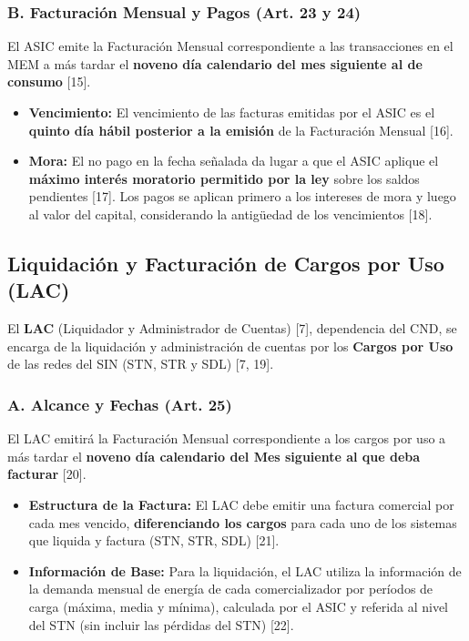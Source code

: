 \documentclass[a5paper]{book}%
\begin{document}
  \subsubsection*{B. Facturación Mensual y Pagos (Art. 23 y 24)}
  El ASIC emite la Facturación Mensual correspondiente a las transacciones en el MEM a más tardar el \textbf{noveno día calendario del mes siguiente al de consumo} [15].
  \begin{itemize}
  	\item \textbf{Vencimiento:} El vencimiento de las facturas emitidas por el ASIC es el \textbf{quinto día hábil posterior a la emisión} de la Facturación Mensual [16].
  	\item \textbf{Mora:} El no pago en la fecha señalada da lugar a que el ASIC aplique el \textbf{máximo interés moratorio permitido por la ley} sobre los saldos pendientes [17]. Los pagos se aplican primero a los intereses de mora y luego al valor del capital, considerando la antigüedad de los vencimientos [18].
  \end{itemize}
  
  \subsection{Liquidación y Facturación de Cargos por Uso (LAC)}
  
  El \textbf{LAC} (Liquidador y Administrador de Cuentas) [7], dependencia del CND, se encarga de la liquidación y administración de cuentas por los \textbf{Cargos por Uso} de las redes del SIN (STN, STR y SDL) [7, 19].
  
  \subsubsection*{A. Alcance y Fechas (Art. 25)}
  El LAC emitirá la Facturación Mensual correspondiente a los cargos por uso a más tardar el \textbf{noveno día calendario del Mes siguiente al que deba facturar} [20].
  \begin{itemize}
  	\item \textbf{Estructura de la Factura:} El LAC debe emitir una factura comercial por cada mes vencido, \textbf{diferenciando los cargos} para cada uno de los sistemas que liquida y factura (STN, STR, SDL) [21].
  	\item \textbf{Información de Base:} Para la liquidación, el LAC utiliza la información de la demanda mensual de energía de cada comercializador por períodos de carga (máxima, media y mínima), calculada por el ASIC y referida al nivel del STN (sin incluir las pérdidas del STN) [22].
  \end{itemize}
  
\end{document}
